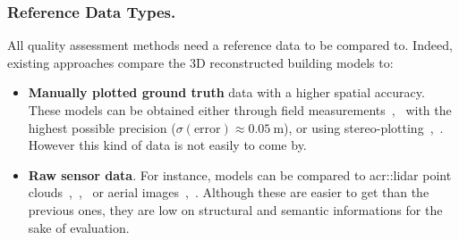 \documentclass[runningheads]{llncs}
\begin{document}
\subsubsection{Reference Data Types.}
All quality assessment methods need a reference data to be compared to. Indeed, existing approaches compare the 3D reconstructed building models to:
\begin{itemize}
    \item \textbf{Manually plotted ground truth} data with a higher spatial accuracy. These models can be obtained either through field measurements~\cite{Kaartinen2005},~\cite{vogtle2003quality} with the highest possible precision ($\sigma(\text{error}) \approx \SI{0.05}{\meter}$), or using stereo-plotting~\cite{Kaartinen2005},~\cite{Zeng2014}. However this kind of data is not easily to come by.
    \item \textbf{Raw sensor data}. For instance, models can be compared to \acrfull{acr::lidar} point clouds~\cite{Akca2010},~\cite{lafarge2012creating},~\cite{li2016boxfitting} or aerial images~\cite{boudet2006supervised},~\cite{Michelin2013}. Although these are easier to get than the previous ones, they are low on structural and semantic informations for the sake of evaluation.
\end{itemize}
\end{document}
